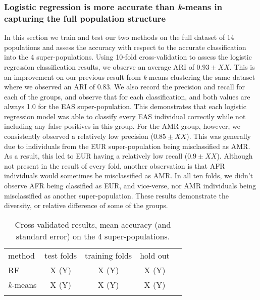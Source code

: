 \documentclass{llncs}
\newcommand{\kMeans}{\textit{k}-means}
\begin{document}
{\subsubsection{Logistic regression is more accurate than \kMeans{} in capturing the full population structure}
In this section we train and test our two methods on the full dataset of 14 populations and assess the accuracy with respect to the accurate classification into the 4 super-populations.
Using 10-fold cross-validation to assess the logistic regression classification results, we observe an average ARI of \(0.93 \pm{} XX\). This is an improvement on our previous result from \kMeans{} clustering the same dataset
where we observed an ARI of \(0.83\).
We also record the precision and recall for each of the groups, and observe that for each classification, and both values are always 1.0 for the EAS super-population. This demonstrates that each logistic regression model was able to classify every EAS individual correctly while not including any false positives in this group.
For the AMR group, however, we consistently observed a relatively low precision (\(0.85\pm{} XX \)). This was generally due to individuals from the EUR super-population being misclassified as AMR. As a result, this led to EUR having a relatively low recall (\(0.9 \pm XX \)).
Although not present in the result of every fold, another observation is that AFR individuals would sometimes be misclassified as AMR. In all ten folds, we didn't observe AFR being classified as EUR, and vice-verse, nor AMR individuals being misclassified as another super-population.
These results demonstrate the diversity, or relative difference of some of the groups. 


\begin{table}
\caption{Cross-validated results, mean accuracy (and standard error) on the 4 super-populations.}
\begin{center}
\renewcommand{\arraystretch}{1.4}
\setlength\tabcolsep{3pt}
\begin{tabular}{lcccc}
\hline\noalign{\smallskip}
method  & test folds & training folds & hold out \\
RF  & X (Y) & X (Y) & X (Y) \\
\kMeans & X (Y) & X (Y) & X (Y) \\
\noalign{\smallskip}
\hline
\end{tabular}
\end{center}
\end{table}







}
\end{document}
